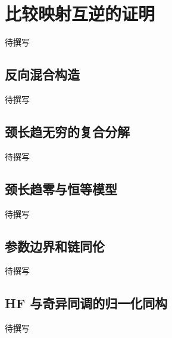 
% 
% 

\section{比较映射互逆的证明}
\label{g4:sec:2703}

待撰写

\subsection{反向混合构造}
\label{g4:subsec:2703:01}
待撰写

\subsection{颈长趋无穷的复合分解}
\label{g4:subsec:2703:02}
待撰写

\subsection{颈长趋零与恒等模型}
\label{g4:subsec:2703:03}
待撰写

\subsection{参数边界和链同伦}
\label{g4:subsec:2703:04}
待撰写

\subsection{HF 与奇异同调的归一化同构}
\label{g4:subsec:2703:05}
待撰写
